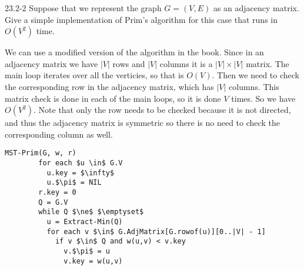 \begin{problem}{23.2-2}
  Suppose that we represent the graph $G = (V,E)$ as an adjacency matrix. Give a simple implementation of Prim's
  algorithm for this case that runs in $O(V^2)$ time.
  \begin{solution}
    We can use a modified version of the algorithm in the book. Since in an adjacency matrix we have $|V|$ rows and $|V|$
    columns it is a $|V| \times |V|$ matrix. The main loop iterates over all the verticies, so that is $O(V)$. Then we need
    to check the corresponding row in the adjacency matrix, which has $|V|$ columns. This matrix check is done in each of
    the main loops, so it is done $V$ times. So we have $O(V^2)$. Note that only the row needs to be checked because it
    is not directed, and thus the adjacency matrix is symmetric so there is no need to check the corresponding column as
    well.
    \begin{lstlisting}[mathescape]
      MST-Prim(G, w, r)
        for each $u \in$ G.V
          u.key = $\infty$
          u.$\pi$ = NIL
        r.key = 0
        Q = G.V
        while Q $\ne$ $\emptyset$
          u = Extract-Min(Q)
          for each v $\in$ G.AdjMatrix[G.rowof(u)][0..|V| - 1]
            if v $\in$ Q and w(u,v) < v.key
              v.$\pi$ = u
              v.key = w(u,v)
    \end{lstlisting}
  \end{solution}
\end{problem}


